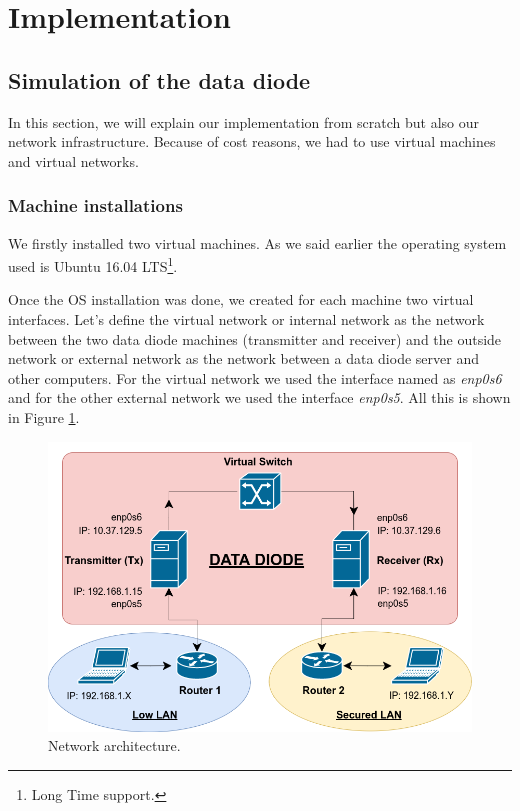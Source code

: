 \documentclass[a4paper,10pt]{article}
\begin{document}
\section{Implementation}
\subsection{Simulation of the data diode}
In this section, we will explain our implementation from scratch but also our network infrastructure. Because of cost reasons, we had to use virtual machines and virtual networks. 

\subsubsection{Machine installations}
We firstly installed two virtual machines. As we said earlier the operating system used is Ubuntu 16.04 LTS\footnote{Long Time support.}. 

Once the OS installation was done, we created for each machine two virtual interfaces. Let's define the virtual network or internal network as the network between the two data diode machines (transmitter and receiver) and the outside network or external network as the network between a data diode server and other computers. For the virtual network we used the interface named as \emph{enp0s6} and for the other external network we used the interface \emph{enp0s5}. All this is shown in Figure \ref{fig:netvirt}.

\begin{figure}[!h]
\centering
\includegraphics[scale=0.5]{images/schema2.png}
\caption{Network architecture.}
\label{fig:netvirt}
\end{figure}
\end{document}
